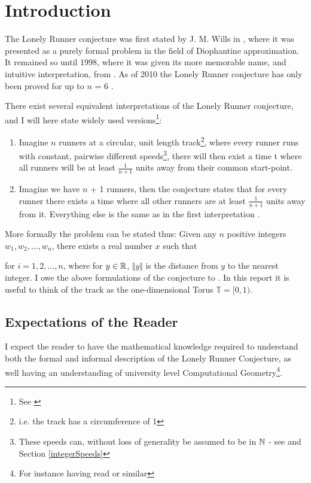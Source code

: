 \section{Introduction}
\label{introduction}
The Lonely Runner conjecture was first stated by J. M. Wills in \cite{JMWills}, where it was presented as a purely formal problem in the field of Diophantine approximation. It remained so until 1998, where it was given its more memorable name, and intuitive interpretation, from \cite{Bienia97flows.view-obstructions}. As of 2010 the Lonely Runner conjecture has only been proved for up to $n$ = 6 \cite{serra_thelonely}.

There exist several equivalent interpretations of the Lonely Runner conjecture, and I will here state widely used versions\footnote{See \cite{ANote}}:
\begin{enumerate}
\item Imagine $n$ runners at a circular, unit length track\footnote{i.e. the track has a circumference of 1}, where every runner runs with constant, pairwise different speeds\footnote{These speeds can, without loss of generality be assumed to be in $\mathbb{N}$ - see \cite{Bienia97flows.view-obstructions} and Section \ref{integerSpeeds}}, there will then exist a time t where all runners will be at least $\frac{1}{n + 1}$ units away from their common start-point.\\

\item Imagine we have $n$ + 1 runners, then the conjecture states that for every runner there exists a time where all other runners are at least $\frac{1}{n + 1}$ units away from it. Everything else is the same as in the first interpretation \cite{Bienia97flows.view-obstructions}.\\
\end{enumerate}

More formally the problem can be stated thus: 
Given any $n$ positive integers $w_1, w_2, \ldots, w_n$, there exists a real number $x$ such that 

for $i = 1, 2, \ldots, n$, where for $y \in \mathbb{R}$, $\Vert y \Vert$ is the distance from $y$ to the nearest integer. I owe the above formulations of the conjecture to \cite{ANote}. In this report it is useful to think of the track as the one-dimensional Torus $\mathbb{T} = [0,1)$.

\subsection{Expectations of the Reader}
I expect the reader to have the mathematical knowledge required to understand both the formal and informal description of the Lonely Runner Conjecture, as well having an understanding of university level Computational Geometry\footnote{For instance having read \cite{citeulike:3347056} or similar}.

